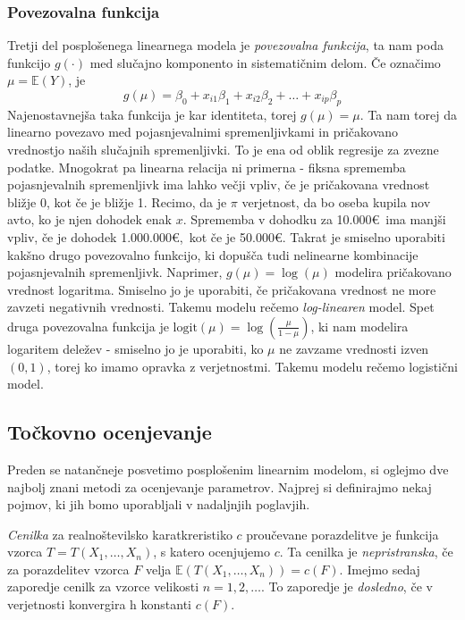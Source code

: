 \documentclass[12pt,a4paper]{amsart}
\theoremstyle{definition} %
\theoremstyle{plain} %
\begin{document}
\subsubsection{Povezovalna funkcija}
Tretji del posplošenega linearnega modela je \textit{povezovalna funkcija}, ta nam poda funkcijo $g(\cdot)$ med slučajno komponento
in sistematičnim delom. Če označimo $\mu = \mathbb{E}(Y)$, je
\[
    g(\mu) = \beta_{0} + x_{i1}\beta_{1} + x_{i2}\beta_{2} + \ldots + x_{ip}\beta_{p}
\]
Najenostavnejša taka funkcija je kar identiteta, torej $g(\mu) = \mu$. Ta nam torej da linearno povezavo med pojasnjevalnimi spremenljivkami 
in pričakovano vrednostjo naših slučajnih spremenljivki. To je ena od oblik regresije za zvezne podatke.
Mnogokrat pa linearna relacija ni primerna - fiksna sprememba pojasnjevalnih spremenljivk ima lahko večji vpliv, če je pričakovana vrednost 
bližje 0, kot če je bližje 1. Recimo, da je $\pi$ verjetnost, da bo oseba kupila nov avto, ko je njen dohodek enak $x$. Sprememba v dohodku
za 10.000\euro~ima manjši vpliv, če je dohodek 1.000.000\euro,~kot če je 50.000\euro.
Takrat je smiselno uporabiti kakšno drugo povezovalno funkcijo, ki dopušča tudi nelinearne kombinacije pojasnjevalnih
spremenljivk. Naprimer, $g(\mu) = \log(\mu)$ modelira
pričakovano vrednost logaritma. Smiselno jo je uporabiti, če pričakovana vrednost ne more zavzeti negativnih vrednosti. Takemu modelu rečemo
\textit{log-linearen} model.
Spet druga povezovalna funkcija je $\mathrm{logit}(\mu) = \log(\frac{\mu}{1-\mu})$, ki nam modelira logaritem deležev - smiselno jo je uporabiti, 
ko $\mu$ ne zavzame vrednosti izven $(0,1)$, torej ko imamo opravka z verjetnostmi. Takemu modelu rečemo logistični model.
\subsection{Točkovno ocenjevanje}
Preden se natančneje posvetimo posplošenim linearnim modelom, si oglejmo dve najbolj znani metodi za ocenjevanje parametrov.
Najprej si definirajmo nekaj pojmov, ki jih bomo uporabljali v nadaljnjih poglavjih.

\textit{Cenilka} za realnoštevilsko karatkreristiko $c$ proučevane porazdelitve je funkcija vzorca $T=T(X_{1},\ldots,X_{n})$, s katero ocenjujemo $c.$
Ta cenilka je \textit{nepristranska}, če za porazdelitev vzorca $F$ velja $\mathbb{E}(T(X_{1},\ldots,X_{n})) = c(F).$
Imejmo sedaj zaporedje cenilk za vzorce velikosti $n=1,2,\ldots.$ To zaporedje je \textit{dosledno}, če v verjetnosti konvergira h konstanti $c(F).$
\end{document}
